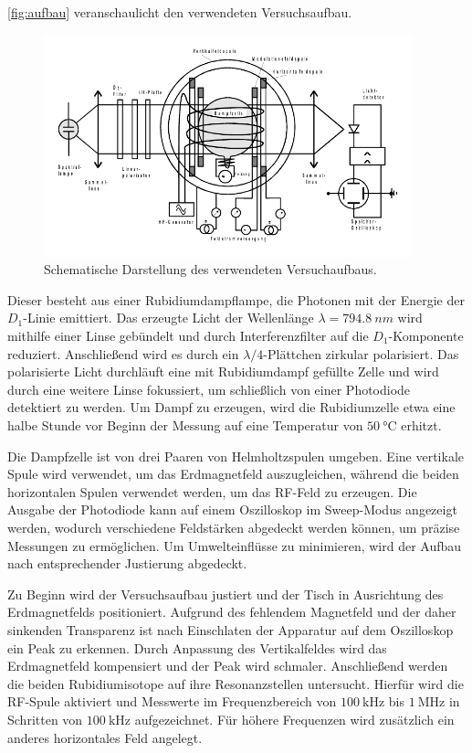 \autoref{fig:aufbau} veranschaulicht den verwendeten Versuchsaufbau.
\begin{figure}
    \centering
    \includegraphics[width=0.95\textwidth]{pictures/Aufbau2.pdf}
    \caption{Schematische Darstellung des verwendeten Versuchaufbaus. \cite{v21}}
    \label{fig:aufbau}
\end{figure} 

Dieser besteht aus einer Rubidiumdampflampe, die Photonen mit der Energie der $D_1$-Linie emittiert. 
Das erzeugte Licht der Wellenlänge $\lambda = \qty{794.8}{nm}$ wird mithilfe einer Linse gebündelt und 
durch Interferenzfilter auf die $D_1$-Komponente reduziert. 
Anschließend wird es durch ein $\lambda/4$-Plättchen zirkular polarisiert. 
Das polarisierte Licht durchläuft eine mit Rubidiumdampf gefüllte Zelle
und wird durch eine weitere Linse fokussiert, um schließlich von einer Photodiode detektiert zu werden. 
Um Dampf zu erzeugen, wird die Rubidiumzelle etwa eine halbe Stunde vor Beginn der Messung auf eine Temperatur von $\SI{50}{\celsius}$ erhitzt.

Die Dampfzelle ist von drei Paaren von Helmholtzspulen umgeben. 
Eine vertikale Spule wird verwendet, um das Erdmagnetfeld auszugleichen, 
während die beiden horizontalen Spulen verwendet werden, um das RF-Feld zu erzeugen. 
Die Ausgabe der Photodiode kann auf einem Oszilloskop im Sweep-Modus angezeigt werden, 
wodurch verschiedene Feldstärken abgedeckt werden können, um präzise Messungen zu ermöglichen. 
Um Umwelteinflüsse zu minimieren, wird der Aufbau nach entsprechender Justierung abgedeckt.

Zu Beginn wird der Versuchsaufbau justiert und der Tisch in Ausrichtung des Erdmagnetfelds positioniert. 
Aufgrund des fehlendem Magnetfeld und der daher sinkenden Transparenz
ist nach Einschlaten der Apparatur auf dem Oszilloskop ein Peak zu erkennen.
Durch Anpassung des Vertikalfeldes wird das Erdmagnetfeld kompensiert und der Peak wird schmaler. 
Anschließend werden die beiden Rubidiumisotope auf ihre Resonanzstellen untersucht. 
Hierfür wird die RF-Spule aktiviert und Messwerte im Frequenzbereich 
von $\SI{100}{\kilo\hertz}$ bis $\SI{1}{\mega\hertz}$ in Schritten von $\SI{100}{\kilo\hertz}$ aufgezeichnet. 
Für höhere Frequenzen wird zusätzlich ein anderes horizontales Feld angelegt.